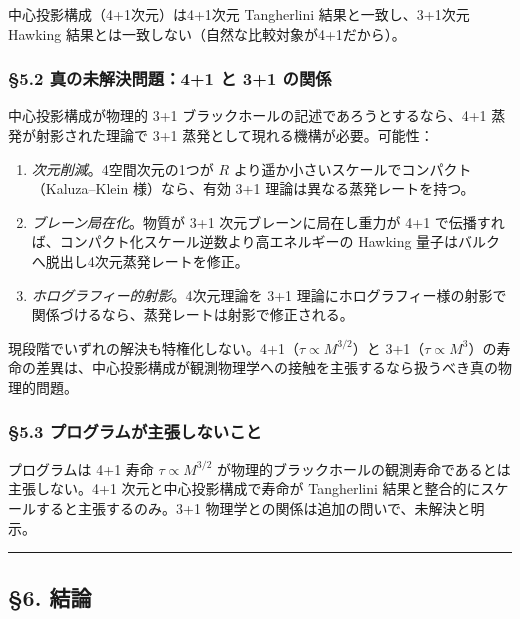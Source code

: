 \documentclass[a4paper,11pt]{ltjsarticle}
\theoremstyle{definition}
\providecommand{\tightlist}{\setlength{\itemsep}{0pt}\setlength{\parskip}{0pt}}
\begin{document}
中心投影構成（4+1次元）は4+1次元 Tangherlini 結果と一致し、3+1次元
Hawking 結果とは一致しない（自然な比較対象が4+1だから）。

\subsubsection{§5.2 真の未解決問題：4+1 と 3+1
の関係}\label{ux771fux306eux672aux89e3ux6c7aux554fux984c41-ux3068-31-ux306eux95a2ux4fc2}

中心投影構成が物理的 3+1 ブラックホールの記述であろうとするなら、4+1
蒸発が射影された理論で 3+1 蒸発として現れる機構が必要。可能性：

\begin{enumerate}
\def\labelenumi{\arabic{enumi}.}
\tightlist
\item
  \emph{次元削減}。4空間次元の1つが \(R\)
  より遥か小さいスケールでコンパクト（Kaluza--Klein 様）なら、有効 3+1
  理論は異なる蒸発レートを持つ。
\item
  \emph{ブレーン局在化}。物質が 3+1 次元ブレーンに局在し重力が 4+1
  で伝播すれば、コンパクト化スケール逆数より高エネルギーの Hawking
  量子はバルクへ脱出し4次元蒸発レートを修正。
\item
  \emph{ホログラフィー的射影}。4次元理論を 3+1
  理論にホログラフィー様の射影で関係づけるなら、蒸発レートは射影で修正される。
\end{enumerate}

現段階でいずれの解決も特権化しない。4+1（\(\tau \propto M^{3/2}\)）と
3+1（\(\tau \propto M^3\)）の寿命の差異は、中心投影構成が観測物理学への接触を主張するなら扱うべき真の物理的問題。

\subsubsection{§5.3
プログラムが主張しないこと}\label{ux30d7ux30edux30b0ux30e9ux30e0ux304cux4e3bux5f35ux3057ux306aux3044ux3053ux3068}

プログラムは 4+1 寿命 \(\tau \propto M^{3/2}\)
が物理的ブラックホールの観測寿命であるとは主張しない。4+1
次元と中心投影構成で寿命が Tangherlini
結果と整合的にスケールすると主張するのみ。3+1
物理学との関係は追加の問いで、未解決と明示。

\begin{center}\rule{0.5\linewidth}{0.5pt}\end{center}

\subsection{§6. 結論}\label{ux7d50ux8ad6}
\end{document}
